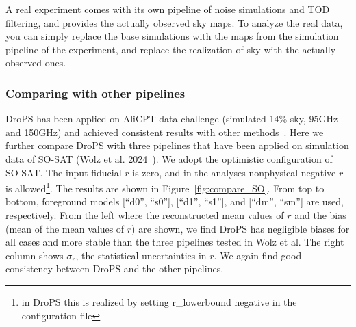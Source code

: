 \documentclass[12pt, a4paper]{ctexart} %
\begin{document}
A real experiment comes with its own pipeline of noise simulations and TOD filtering, and provides the actually observed sky maps. To analyze the real data, you can simply replace the base simulations with the maps from the simulation pipeline of the experiment, and replace the realization of sky with the actually observed ones.


\subsubsection{Comparing with other pipelines}

DroPS has been applied on AliCPT data challenge (simulated 14\% sky, 95GHz and 150GHz) and achieved consistent results with other methods~\cite{Zhang24}. Here we further compare DroPS with three pipelines that have been applied on simulation data of SO-SAT (Wolz et al. 2024~\cite{SO-SAT}). We adopt the optimistic configuration of SO-SAT. The input fiducial $r$ is zero, and in the analyses nonphysical negative $r$ is allowed\footnote{in DroPS this is realized by setting r\_lowerbound negative in the configuration file}.  The results are shown in Figure~\ref{fig:compare_SO}.  From top to bottom, foreground models [``d0'', ``s0''], [``d1'', ``s1''], and [``dm'', ``sm''] are used, respectively. From the left where the reconstructed mean values of $r$ and the bias (mean of the mean values of $r$) are shown, we find DroPS has negligible biases for all cases and more stable than the three pipelines tested in Wolz et al. The right column shows $\sigma_r$, the statistical uncertainties in $r$. We again find good consistency between DroPS and the other pipelines.
\end{document}
